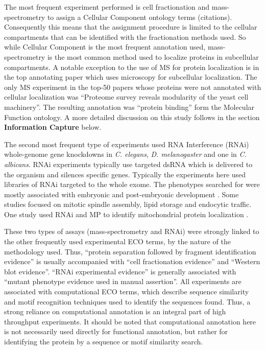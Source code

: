 \documentclass[12pt]{article}
\begin{document}
The most frequent experiment performed is cell fractionation and mass-spectrometry to assign a
Cellular Component ontology terms (citations).  Consequently this means that the assignment
procedure is limited to the cellular compartments that can be identified with the fractionation
methods used\cite{MS-papers}. So while Cellular Component is the most frequent annotation used,
mass-spectrometry is the most common method used to localize proteins in subcellular compartments. A
notable exception to the use of MS for protein localization is in the top annotating paper
\cite{pmid18029348} which uses microscopy for subcellular localization. The only MS experiment in the
top-50 papers whose proteins were not annotated with cellular localization was ``Proteome survey
reveals modularity of the yeast cell machinery''\cite{pmid18029348}. The resulting annotation was
``protein binding'' form the Molecular Function ontology. A more detailed discussion on this study
follows in the section \textbf{Information Capture} below.

The second most frequent type of experiments used RNA Interference (RNAi) whole-genome gene
knockdowns in \textit{C. elegans}, \textit{D. melanogaster} and one in \textit{C. albicans}.  RNAi
experiments typically use targeted dsRNA which is delivered to the organism and silences specific
genes. Typically the experiments here used libraries of RNAi targeted to the whole exome. The
phenotypes searched for were mostly associated with embryonic and post-embryonic development
\cite{relevant papers}. Some studies focused on mitotic spindle assembly\cite{pmid17412918}, lipid
storage\cite{pmid17412918} and endocytic traffic\cite{pmid17412918}. One study used RNAi and MP to identify
mitochondrial protein localization \cite{pmid18433294}.

These two types of assays (mass-spectrometry and RNAi)  were strongly linked to the other
frequently used experimental ECO terms, by the nature of the methodology used. Thus, ``protein
separation followed by fragment identification evidence'' is usually accompanied with ``cell
fractionation evidence'' and ``Western blot evidence''. ``RNAi experimental evidence'' is
generally associated with ``mutant phenotype evidence used in manual assertion''. All experiments
are associated with computational ECO terms, which describe sequence similarity and motif
recognition techniques used to identify the sequences found. Thus, a strong reliance on
computational annotation is an integral part of high throughput experiments. It should be noted
that computational annotation here is not necessarily used directly for functional annotation, but rather
for identifying the protein by a sequence or motif similarity search.
\end{document}
